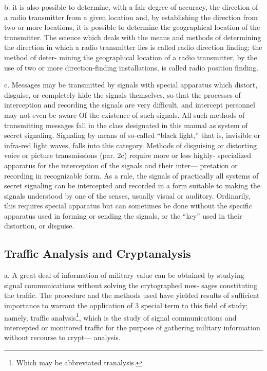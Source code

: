 b. it is also possible to determine, with a fair degree of accuracy, the
direction of a radio transmitter from a given location and, by establishing
the direction from two or more locations, it is possible to determine the
geographical location of the transmitter. The science which deals with
the means and methods of determining the direction in which a radio
transmitter lies is called radio direction ﬁnding; the method of deter-
mining the geographical location of a radio transmitter, by the use of
two or more direction-ﬁnding installations, is called radio position
ﬁnding.

c. Messages may be transmitted by signals with special apparatus
which distort, disguise, or completely hide the signals themselves, so that
the processes of interception and recording the signals are very difficult,
and intercept personnel may not even be aware Of the existence of such
signals. All such methods of transmitting messages fall in the class
designated in this manual as system of secret signaling. Signaling by
means of so-called “black light,” that is, invisible or infra-red light
waves, falls into this category. Methods of disguising or distorting
voice or picture transmissions (par. 2c) require more or less highly-
specialized apparatus for the interception of the signals and their inter—
pretation or recording in recognizable form. As a rule, the signals of
practically all systems of secret signaling can be intercepted and recorded
in a form suitable to making the signals understood by one of the senses,
usually visual or auditory. Ordinarily, this requires special apparatus
but can sometimes be done without the speciﬁc apparatus used in forming
or sending the signals, or the “key” used in their distortion, or disguise.

\subsection{Traffic Analysis and Cryptanalysis}

a. A great deal of information of military value can be obtained by
studying signal communications without solving the crytographed mes-
sages constituting the trafﬁc. The procedure and the methods used have
yielded results of sufﬁcient importance to warrant the application of 3
special term to this ﬁeld of study; namely, traffic analysis\footnote{ Which may be abbreviated tranalysis.  }, which is the
study of signal communications and intercepted or monitored trafﬁc for
the purpose of gathering military information without recourse to crypt—
analysis.

